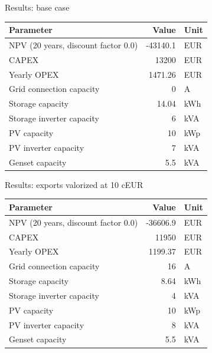 \begin{frame}{Results: base case}
\begin{tabular}{lrl}
\hline
 Parameter                           &    Value & Unit   \\
\hline
 NPV (20 years, discount factor 0.0) & -43140.1 & EUR    \\
 CAPEX                               &    13200 & EUR    \\
 Yearly OPEX                         &  1471.26 & EUR    \\
 Grid connection capacity            &        0 & A      \\
 Storage capacity                    &    14.04 & kWh    \\
 Storage inverter capacity           &        6 & kVA    \\
 PV capacity                         &       10 & kWp    \\
 PV inverter capacity                &        7 & kVA    \\
 Genset capacity                     &      5.5 & kVA    \\
\hline
\end{tabular}
\end{frame}

\begin{frame}{Results: exports valorized at 10 cEUR}
\begin{tabular}{lrl}
\hline
 Parameter                           &    Value & Unit   \\
\hline
 NPV (20 years, discount factor 0.0) & -36606.9 & EUR    \\
 CAPEX                               &    11950 & EUR    \\
 Yearly OPEX                         &  1199.37 & EUR    \\
 Grid connection capacity            &       16 & A      \\
 Storage capacity                    &     8.64 & kWh    \\
 Storage inverter capacity           &        4 & kVA    \\
 PV capacity                         &       10 & kWp    \\
 PV inverter capacity                &        8 & kVA    \\
 Genset capacity                     &      5.5 & kVA    \\
\hline
\end{tabular}
\end{frame}

